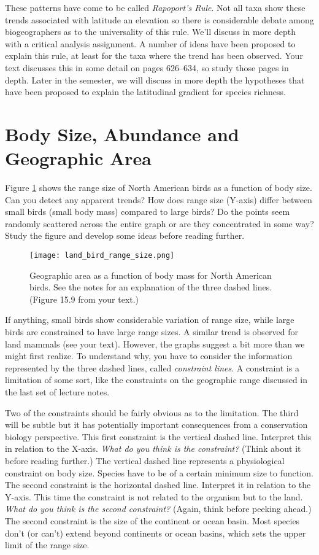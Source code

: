 \documentclass[12pt, oneside]{article}   	%
\begin{document}
These patterns have come to be called \emph{Rapoport's Rule}.  Not all taxa show these trends associated with latitude an elevation so there is considerable debate among biogeographers as to the universality of this rule.  We'll discuss in more depth with a critical analysis assignment.  A number of ideas have been proposed to explain this rule, at least for the taxa where the trend has been observed.  Your text discusses this in some detail on pages 626--634, so study those pages in depth.  Later in the semester, we will discuss in more depth the hypotheses that have been proposed to explain the latitudinal gradient for species richness.

\section{Body Size, Abundance and Geographic Area}

Figure \ref{areabodysize}  shows the range size of North American birds as a function of body size.  Can you detect any apparent trends? How does range size (Y-axis) differ between small birds (small body mass) compared to large birds? Do the points seem randomly scattered across the entire graph or are they concentrated in some way?  Study the figure and develop some ideas before reading further.

\begin{figure}[hb]
	\centering
		\texttt{[image: land\_bird\_range\_size.png]}
		\caption{Geographic area as a function of body mass for North American birds.  See the notes for an explanation of the three dashed lines. (Figure 15.9 from your text.)\label{areabodysize}}
\end{figure}

If anything, small birds show considerable variation of range size, while large birds are constrained to have large range sizes.  A similar trend is observed for land mammals (see your text).  However, the graphs suggest a bit more than we might first realize.  To understand why, you have to consider the information represented by the three dashed lines, called \emph{constraint lines}.   A constraint is a limitation of some sort, like the constraints on the geographic range discussed in the last set of lecture notes.
 
Two of the constraints should be fairly obvious as to the limitation.  The third will be subtle but it has potentially important consequences from a conservation biology perspective.  This first constraint is the vertical dashed line.  Interpret this in relation to the X-axis. \emph{What do you think is the constraint?} (Think about it before reading further.) The vertical dashed line represents a physiological constraint on body size.  Species have to be of a certain minimum size to function. The second constraint is the horizontal dashed line. Interpret it in relation to the Y-axis. This time the constraint is not related to the organism but to the land.  \emph{What do you think is the second constraint?} (Again, think before peeking ahead.)  The second constraint is the size of the continent or ocean basin.  Most species don't (or can't) extend beyond continents or ocean basins, which sets the upper limit of the range size.
\end{document}
